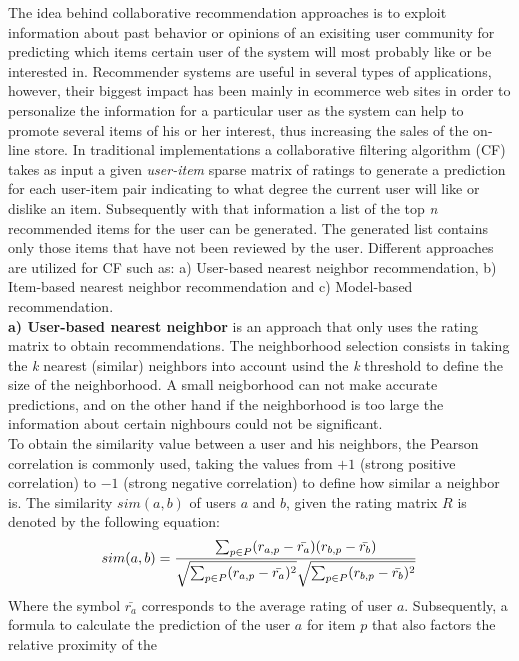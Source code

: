 The idea behind collaborative recommendation approaches is to exploit
information about past behavior or opinions of an exisiting user
community for predicting which items certain user of the system will
most probably like or be interested in\cite{jannach2010recommender}. 
Recommender systems are useful in several types of  applications,
however, their biggest impact has been mainly in ecommerce web sites
in order to personalize the information for a particular user as the
system can help to promote several items of his or her interest, thus
increasing the sales of the on-line store. In traditional
implementations a collaborative filtering algorithm (CF) takes as
input a given \textit{user-item} sparse matrix of ratings to generate a
prediction for each user-item pair indicating to what degree the
current user will like or dislike an item. Subsequently with that
information a list of the top \textit{n} recommended items for the
user can be generated. The generated list contains only those items
that have not been reviewed by the user. Different approaches are
utilized for CF such as: a) User-based nearest 
neighbor recommendation, b) Item-based nearest neighbor 
recommendation and c) Model-based recommendation.\\
\textbf{a) User-based nearest neighbor} is an approach that only 
uses the rating matrix to obtain recommendations. 
The neighborhood selection consists in taking
the \textit{k} nearest (similar) neighbors into account usind the \textit{k} threshold to
define the size of the neighborhood. A small neigborhood can not
make accurate predictions, and on the other hand if the neighborhood
is too large the information about certain nighbours could not be
significant.\\ To obtain the similarity value between a user and his
neighbors, the Pearson correlation is commonly used, taking
the values from $+1$ (strong positive correlation) to $-1$ (strong
negative correlation) to define how similar a neighbor is. The
similarity $sim(a,b)$ of users $a$ and $b$, given the rating matrix
$R$ is denoted by the following equation:
\begin{equation}\label{eq:pearson1}
\displaystyle sim(a,b) = {\sum_{p \in P}(r_{a,p} - 
\bar{r_a})(r_{b,p}- \bar{r_b}) 
\over \sqrt{\sum_{p \in P}(r_{a,p} - \bar{r_a})^2} 
\sqrt{\sum_{p \in P} 
(r_{b,p}- \bar{r_b})^2}}
\end{equation}
Where the symbol $\bar{r_a}$ corresponds to the average rating of user
$a$. Subsequently, a formula to calculate the prediction of the user
$a$ for item $p$ that also factors the relative proximity of the
